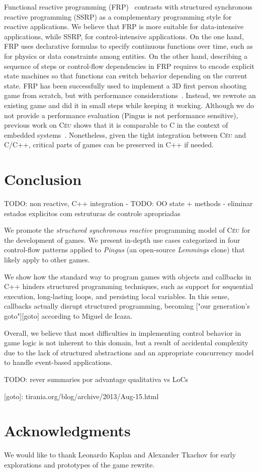 \documentclass{vgtc}                          %
\newcommand{\CEU}{\textsc{C\'{e}u}\xspace}
\begin{document}
Functional reactive programming (FRP)~\cite{frp.fran} contrasts with
structured synchronous reactive programming (SSRP) as a complementary
programming style for reactive applications.
%
We believe that FRP is more suitable for data-intensive applications, while 
SSRP, for control-intensive applications.
%
On the one hand, FRP uses declarative formulas to specify continuous functions 
over time, such as for physics or data constraints among entities.
%
On the other hand, describing a sequence of steps or control-flow dependencies
in FRP requires to encode explicit state machines so that functions can switch
behavior depending on the current state.
%
FRP has been successfully used to implement a 3D first person shooting game
from scratch, but with performance considerations~\cite{games.frag}.
%
Instead, we rewrote an existing game and did it in small steps while keeping it
working.
Although we do not provide a performance evaluation (Pingus is not performance
sensitive), previous work on \CEU shows that it is comparable to C in the
context of embedded systems~\cite{ceu.sensys13}.
Nonetheless, given the tight integration between \CEU and C/C++, critical parts
of games can be preserved in C++ if needed.

\section{Conclusion}
\label{sec.conclusion}

TODO: non reactive, C++ integration
- TODO: OO state + methods
- eliminar estados explicitos com estruturas de controle apropriadas

We promote the \emph{structured synchronous reactive} programming model of
\CEU for the development of games.
We present in-depth use cases categorized in four control-flow patterns applied
to \emph{Pingus} (an open-source \emph{Lemmings} clone) that likely apply to
other games.

We show how the standard way to program games with objects and callbacks in C++
hinders structured programming techniques, such as support for sequential
execution, long-lasting loops, and persisting local variables.
In this sense, callbacks actually disrupt structured programming, becoming
["our generation’s goto"][goto] according to Miguel de Icaza.

Overall, we believe that most difficulties in implementing control behavior in 
game logic is not inherent to this domain, but a result of accidental
complexity due to the lack of structured abstractions and an appropriate
concurrency model to handle event-based applications.

TODO: rever summaries por advantage qualitativa vs LoCs

[goto]: tirania.org/blog/archive/2013/Aug-15.html

\section{Acknowledgments}

We would like to thank Leonardo Kaplan and Alexander Tkachov for early
explorations and prototypes of the game rewrite.



\end{document}
